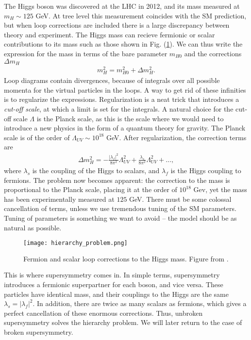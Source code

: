 \documentclass[twoside,english]{uiofysmaster}
\begin{document}
The Higgs boson was discovered at the LHC in 2012, and its mass  measured at $m_H \sim 125$ GeV. At tree level this measurement coincides with the SM prediction, but when loop corrections are included there is a large discrepancy between theory and experiment. The Higgs mass can recieve fermionic or scalar contributions to its mass such as those shown in Fig. (\ref{Fig:: Phys. bac.: Higgs mass contributions}). We can thus write the expression for the mass in terms of the bare parameter $m_{H0}$ and the corrections $\Delta m_H$
\begin{align*}
m_H^2 = m_{H0}^2 + \Delta m_H^2.
\end{align*}
Loop diagrams contain divergences, because of integrals over all possible momenta for the virtual particles in the loops. A way to get rid of these infinities is to regularize the expressions. Regularization is a neat trick that introduces a \textit{cut-off scale}, at which a limit is set for the integrals. A natural choice for the cut-off scale $\Lambda$ is the Planck scale, as this is the scale where we would need to introduce a new physics in the form of a quantum theory for gravity. The Planck scale is of the order of $\Lambda_{UV} \sim 10^{18}$ GeV. After regularization, the correction terms are
\begin{align}
\Delta m_H^2 = - \frac{|\lambda_f|^2}{8\pi^2} \Lambda_{UV}^2 + \frac{\lambda_s}{8\pi^2} \Lambda_{UV}^2 +...,
\end{align}
where $\lambda_s$ is the coupling of the Higgs to scalars, and $\lambda_f$ is the Higgs coupling to fermions. The problem now becomes apparent: the correction to the mass is proportional to the Planck scale, placing it at the order of $10^{18}$ Gev, yet the mass has been experimentally measured at $125$ GeV. There must be some colossal cancellation of terms, unless we use tremendous tuning of the SM parameters. Tuning of parameters is something we want to avoid -- the model should be as natural as possible. 

\begin{figure}[H]
\centering
\texttt{[image: hierarchy\_problem.png]}
\caption{Fermion and scalar loop corrections to the Higgs mass. Figure from \cite{batzing2017lecture}.}
\label{Fig:: Phys. bac.: Higgs mass contributions}
\end{figure}

This is where supersymmetry comes in. In simple terms, supersymmetry introduces a fermionic superpartner for each boson, and vice versa. These particles have identical mass, and their couplings to the Higgs are the same $\lambda_s = |\lambda_f|^2$. In addition, there are twice as many scalars as fermions, which gives a perfect cancellation of these enormous corrections. Thus, unbroken supersymmetry solves the hierarchy problem. We will later return to the case of broken supersymmetry.
\end{document}
